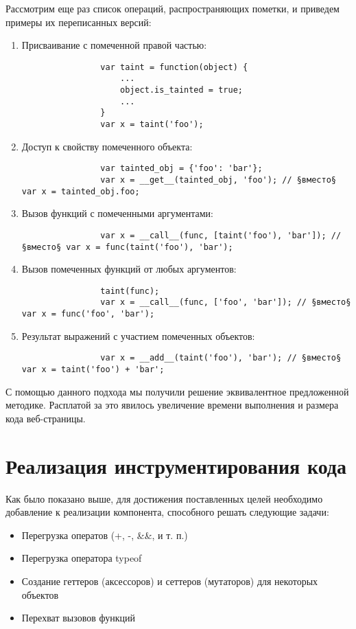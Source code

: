	Рассмотрим еще раз список операций, распространяющих пометки, и приведем примеры их переписанных версий:
	\begin{enumerate}
		\item Присваивание с помеченной правой частью:
			\begin{lstlisting}
				var taint = function(object) {
					...
					object.is_tainted = true;
					...
				}
				var x = taint('foo');
			\end{lstlisting}
		\item Доступ к свойству помеченного объекта: 
			\begin{lstlisting}
				var tainted_obj = {'foo': 'bar'}; 
				var x = __get__(tainted_obj, 'foo'); // §вместо§ var x = tainted_obj.foo; 
			\end{lstlisting}
		\item Вызов функций с помеченными аргументами:
			\begin{lstlisting}
				var x = __call__(func, [taint('foo'), 'bar']); // §вместо§ var x = func(taint('foo'), 'bar');
			\end{lstlisting}
		\item Вызов помеченных функций от любых аргументов:
			\begin{lstlisting}
				taint(func);
				var x = __call__(func, ['foo', 'bar']); // §вместо§ var x = func('foo', 'bar');
			\end{lstlisting}
		\item Результат выражений с участием помеченных объектов:
			\begin{lstlisting}
				var x = __add__(taint('foo'), 'bar'); // §вместо§ var x = taint('foo') + 'bar';
			\end{lstlisting}
	\end{enumerate}

	С помощью данного подхода мы получили решение эквивалентное предложенной методике. Расплатой за это явилось увеличение времени выполнения и размера кода веб-страницы.

\section{Реализация инструментирования кода}
Как было показано выше, для достижения поставленных целей необходимо добавление к реализации компонента, способного решать следующие задачи:

\begin{itemize}
	\item Перегрузка оператов (+, -, \&\&, и т. п.)
	\item Перегрузка оператора typeof
	\item Создание геттеров (аксессоров) и сеттеров (мутаторов) для некоторых объектов
	\item Перехват вызовов функций
\end{itemize}


